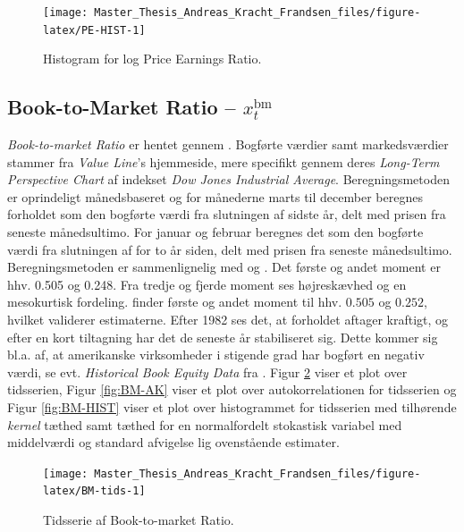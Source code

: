 \documentclass[
  a4paper,
  oneside]{memoir}
\begin{document}
\begin{figure}[H]

{\centering \texttt{[image: Master\_Thesis\_Andreas\_Kracht\_Frandsen\_files/figure-latex/PE-HIST-1]} 

}

\caption{Histogram for log Price Earnings Ratio.}\label{fig:PE-HIST}
\end{figure}

\hypertarget{book-to-market-ratio-x_ttextbm}{%
\subsection{\texorpdfstring{Book-to-Market Ratio -- \(x_t^{\text{bm}}\)}{Book-to-Market Ratio -- x\_t\^{}\{\textbackslash text\{bm\}\}}}\label{book-to-market-ratio-x_ttextbm}}

\emph{Book-to-market Ratio} er hentet gennem \citep{Goyal2007}. Bogførte værdier samt markedsværdier stammer fra \emph{Value Line}'s hjemmeside, mere specifikt gennem deres \emph{Long-Term Perspective Chart} af indekset \emph{Dow Jones Industrial Average}. Beregningsmetoden er oprindeligt månedsbaseret og for månederne marts til december beregnes forholdet som den bogførte værdi fra slutningen af sidste år, delt med prisen fra seneste månedsultimo. For januar og februar beregnes det som den bogførte værdi fra slutningen af for to år siden, delt med prisen fra seneste månedsultimo. Beregningsmetoden er sammenlignelig med \citep{Kothari1997} og \citep{Pontiff1998}. Det første og andet moment er hhv. 0.505 og 0.248. Fra tredje og fjerde moment ses højreskævhed og en mesokurtisk fordeling. \citep{Pontiff1998} finder første og andet moment til hhv. \(0.505\) og \(0.252\), hvilket validerer estimaterne. Efter 1982 ses det, at forholdet aftager kraftigt, og efter en kort tiltagning har det de seneste år stabiliseret sig. Dette kommer sig bl.a. af, at amerikanske virksomheder i stigende grad har bogført en negativ værdi, se evt. \emph{Historical Book Equity Data} fra \citep{French2020}. Figur \ref{fig:BM-tids} viser et plot over tidsserien, Figur \ref{fig:BM-AK} viser et plot over autokorrelationen for tidsserien og Figur \ref{fig:BM-HIST} viser et plot over histogrammet for tidsserien med tilhørende \emph{kernel} tæthed samt tæthed for en normalfordelt stokastisk variabel med middelværdi og standard afvigelse lig ovenstående estimater.

\begin{figure}[H]

{\centering \texttt{[image: Master\_Thesis\_Andreas\_Kracht\_Frandsen\_files/figure-latex/BM-tids-1]} 

}

\caption{Tidsserie af Book-to-market Ratio.}\label{fig:BM-tids}
\end{figure}
\end{document}
